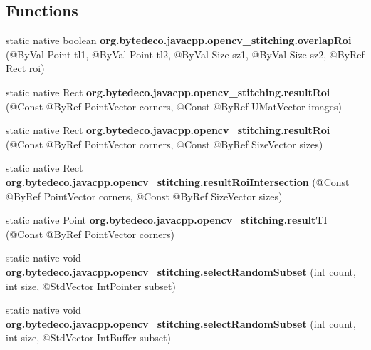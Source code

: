 \subsection*{Functions}
\begin{DoxyCompactItemize}
\item 
\mbox{\label{group__stitching_gacf4ed576f958ddf1bc53f06ef4d33df6}} 
static native boolean {\bfseries org.\+bytedeco.\+javacpp.\+opencv\+\_\+stitching.\+overlap\+Roi} (@By\+Val Point tl1, @By\+Val Point tl2, @By\+Val Size sz1, @By\+Val Size sz2, @By\+Ref Rect roi)
\item 
\mbox{\label{group__stitching_ga859ea44005cd9edc8317630a7334e1b6}} 
static native Rect {\bfseries org.\+bytedeco.\+javacpp.\+opencv\+\_\+stitching.\+result\+Roi} (@Const @By\+Ref Point\+Vector corners, @Const @By\+Ref U\+Mat\+Vector images)
\item 
\mbox{\label{group__stitching_gad2b343099d0b16c7ba33993e922eed86}} 
static native Rect {\bfseries org.\+bytedeco.\+javacpp.\+opencv\+\_\+stitching.\+result\+Roi} (@Const @By\+Ref Point\+Vector corners, @Const @By\+Ref Size\+Vector sizes)
\item 
\mbox{\label{group__stitching_gaa882d01ddd9b9cfa030cf3436340973f}} 
static native Rect {\bfseries org.\+bytedeco.\+javacpp.\+opencv\+\_\+stitching.\+result\+Roi\+Intersection} (@Const @By\+Ref Point\+Vector corners, @Const @By\+Ref Size\+Vector sizes)
\item 
\mbox{\label{group__stitching_gaa820d4f157eabdece019843e7334f493}} 
static native Point {\bfseries org.\+bytedeco.\+javacpp.\+opencv\+\_\+stitching.\+result\+Tl} (@Const @By\+Ref Point\+Vector corners)
\item 
\mbox{\label{group__stitching_ga8e152fb5af89a56c5ffc2eb169f19162}} 
static native void {\bfseries org.\+bytedeco.\+javacpp.\+opencv\+\_\+stitching.\+select\+Random\+Subset} (int count, int size, @Std\+Vector Int\+Pointer subset)
\item 
\mbox{\label{group__stitching_gae2a83ff8768a6a4016b4f365943ad96f}} 
static native void {\bfseries org.\+bytedeco.\+javacpp.\+opencv\+\_\+stitching.\+select\+Random\+Subset} (int count, int size, @Std\+Vector Int\+Buffer subset)

\end{DoxyCompactItemize}
